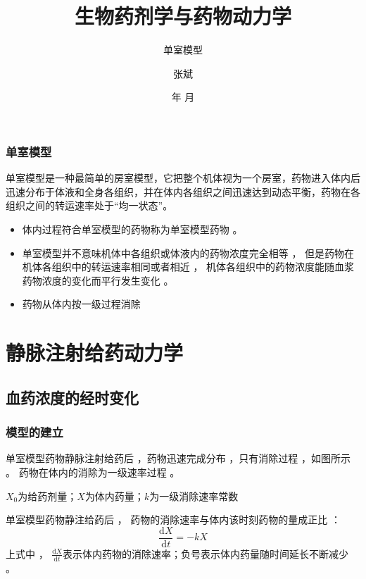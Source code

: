 \documentclass[dvipsnames, svgnames, x11names]{beamer}
\title{生物药剂学与药物动力学}
\subtitle{单室模型}
\author{张斌}
\institute[理工系]{河北农业大学 理工系}
\date{\the\year 年 \the\month 月}
\begin{document}
    
\maketitle


\begin{frame}{}
	\begin{center}
		{\Huge {}}
	\end{center}
	\tableofcontents[subsectionstyle=hide/hide/show]
	\thispagestyle{empty}
	\addtocounter{framenumber}{-1}
\end{frame}

\begin{frame}
    \frametitle{单室模型}
    单室模型是一种最简单的房室模型，它把整个机体视为一个房室，药物进入体内后迅速分布于体液和全身各组织，并在体内各组织之间迅速达到动态平衡，药物在各组织之间的转运速率处于“均一状态”。
    
    \begin{itemize}
      \item 体内过程符合单室模型的药物称为单室模型药物 。
      \item 单室模型并不意味机体中各组织或体液内的药物浓度完全相等 ， 但是药物在机体各组织中的转运速率相同或者相近 ， 机体各组织中的药物浓度能随血浆药物浓度的变化而平行发生变化 。
      \item 药物从体内按一级过程消除
    \end{itemize}
    
\end{frame}


\section{静脉注射给药动力学}

\subsection{血药浓度的经时变化}

\begin{frame}
    \frametitle{模型的建立}
    单室模型药物静脉注射给药后 ，药物迅速完成分布 ，只有消除过程 ，如图所示 。 药物在体内的消除为一级速率过程 。
\begin{center}
\end{center}
$X_0$为给药剂量；$X$为体内药量；$k$为一级消除速率常数

单室模型药物静注给药后 ， 药物的消除速率与体内该时刻药物的量成正比 ：
\[
    \frac{\mathrm{d}X}{\mathrm{d}t}=-kX
\]
上式中 ， $\frac{\mathrm{d}X}{\mathrm{d}t}$表示体内药物的消除速率；负号表示体内药量随时间延长不断减少 。
\end{frame}
\end{document}

